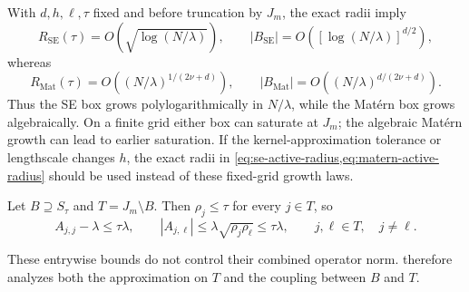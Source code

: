 With \(d,h,\ell,\tau\) fixed and before truncation by \(J_m\), the exact
radii imply
\begin{equation}
    R_{\mathrm{SE}}(\tau)
    =O\!\left(\sqrt{\log(N/\lambda)}\right),
    \qquad
    |B_{\mathrm{SE}}|
    =O\!\left([\log(N/\lambda)]^{d/2}\right),
    \label{eq:se-box-growth}
\end{equation}
whereas
\begin{equation}
    R_{\mathrm{Mat}}(\tau)
    =O\!\left((N/\lambda)^{1/(2\nu+d)}\right),
    \qquad
    |B_{\mathrm{Mat}}|
    =O\!\left((N/\lambda)^{d/(2\nu+d)}\right).
    \label{eq:matern-box-growth}
\end{equation}
Thus the SE box grows polylogarithmically in \(N/\lambda\), while the
Mat\'ern box grows algebraically. On a finite grid either box can saturate at
\(J_m\); the algebraic Mat\'ern growth can lead to earlier saturation. If the
kernel-approximation tolerance or lengthscale changes \(h\), the exact radii
in \cref{eq:se-active-radius,eq:matern-active-radius} should be used instead
of these fixed-grid growth laws.

Let \(B\supseteq S_\tau\) and \(T=J_m\setminus B\). Then
\(\rho_j\leq\tau\) for every \(j\in T\), so
\[
    A_{j,j}-\lambda\leq \tau\lambda,
    \qquad
    |A_{j,\ell}|
    \leq
    \lambda\sqrt{\rho_j\rho_\ell}
    \leq
    \tau\lambda,
    \qquad
    j,\ell\in T,\quad j\ne\ell.
\]

These entrywise bounds do not control their combined operator norm.
 therefore analyzes both the approximation on \(T\)
and the coupling between \(B\) and \(T\).



